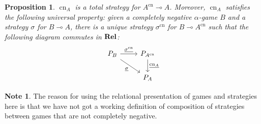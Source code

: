 \documentclass[11pt]{article} %
\theoremstyle{plain} %
\newtheorem{proposition}[theorem]{Proposition}
\theoremstyle{definition} %
\theoremstyle{note}
\newtheorem{note}[theorem]{Note}
\theoremstyle{exercisestyle}
\newcommand{\catname}[1]{{\normalfont\textbf{#1}}}
\newcommand{\Rel}{\catname{Rel}}
\renewcommand{\implies}{\multimap}
\newcommand{\grel}[1]{\underline{#1}}
\DeclareMathOperator{\cn}{cn}
\begin{document}
\begin{proposition}
  \label{CnUniversalProperty}
  $\cn_A$ is a total strategy for $A^{\cn}\implies A$.  Moreover, $\cn_A$ satisfies the following universal property: given a completely negative $\alpha$-game $B$ and a strategy $\sigma$ for $B\implies A$, there is a unique strategy $\sigma^{\cn}$ for $B\implies A^{\cn}$ such that the following diagram commutes in $\Rel$:
  \[
    \begin{tikzcd}
      P_{B} \arrow[r, "\grel{\sigma^{\cn}}"] \arrow[dr, "\grel\sigma"']
        & P_{A^{\cn}} \arrow[d, "\grel{\cn_A}"] \\
        & P_A
    \end{tikzcd}
    \]
\end{proposition}

\begin{note}
  The reason for using the relational presentation of games and strategies here is that we have not got a working definition of composition of strategies between games that are not completely negative.  
\end{note}
\end{document}
